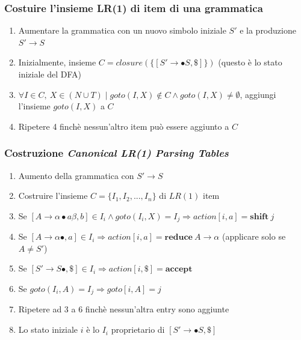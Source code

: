 \subsubsection{Costuire l'insieme LR(1) di item di una grammatica}
\begin{enumerate}
\item Aumentare la grammatica con un nuovo simbolo iniziale $S'$ e la produzione
$S' \to S$
\item Inizialmente, insieme $C = closure(\{[S' \to \bullet S, \$]\})$ (questo
\`e lo stato iniziale del DFA)
\item $\forall I \in C, \ X \in (N \cup T) \mid goto(I,X) \notin C \land
goto(I,X) \neq \emptyset$, aggiungi l'insieme $goto(I,X)$ a $C$
\item Ripetere 4 finch\`e nessun'altro item pu\`o essere aggiunto a $C$
\end{enumerate}

\subsubsection{Costruzione \textit{Canonical LR(1) Parsing Tables}}
\label{sec:step_parsing_table_construction_LR1}
\begin{enumerate}
\item Aumento della grammatica con $S' \to S$
\item Costruire l'insieme $C = \{I_1,I_2,...,I_n\}$ di $LR(1)$ item
\item Se $[A \to \alpha\bullet a\beta,b] \in I_i \land goto(I_i,X)=I_j
\Rightarrow action[i,a]=\mathbf{shift} \ j$
\item Se $[A \to \alpha\bullet, a] \in I_i \Rightarrow action[i,a]=
\mathbf{reduce} \ A \to \alpha$ (applicare solo se $A \neq S'$)
\item Se $[S' \to S\bullet, \$] \in I_i \Rightarrow action[i,\$]=
\mathbf{accept}$
\item Se $goto(I_i,A)=I_j \Rightarrow goto[i,A]=j$
\item Ripetere ad 3 a 6 finch\`e nessun'altra entry sono aggiunte
\item Lo stato iniziale $i$ \`e lo $I_i$ proprietario di $[S' \to \bullet S,
\$]$
\end{enumerate}

